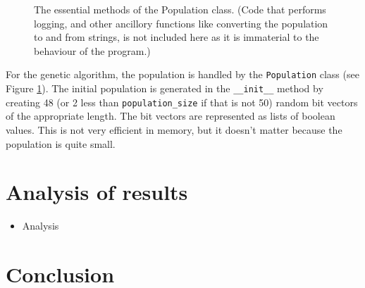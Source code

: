 \documentclass[pdftex,11pt,a4]{article}
\def\code{\lstinline[basicstyle=\textsize\ttfamily]}
\begin{document}
\begin{figure}[p]
  
  \caption{The essential methods of the Population class. (Code that performs logging, and other ancillory functions like converting the population to and from strings, is not included here as it is immaterial to the behaviour of the program.)}
  \label{fig:population-class}
\end{figure}

For the genetic algorithm, the population is handled by the \code{Population} class (see Figure \ref{fig:population-class}). The initial population is generated in the \code{__init__} method by creating 48 (or 2 less than \code{population_size} if that is not 50) random bit vectors of the appropriate length. The bit vectors are represented as lists of boolean values. This is not very efficient in memory, but it doesn't matter because the population is quite small.







\section{Analysis of results}

\begin{itemize}
  \item Analysis
\end{itemize}

\section{Conclusion}

\FloatBarrier


\end{document}
